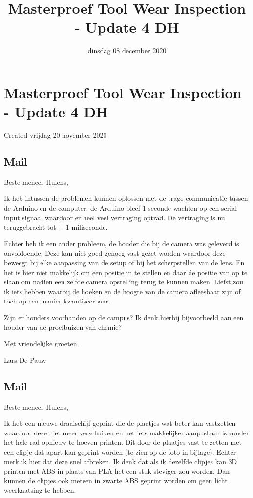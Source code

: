 \documentclass{scrartcl}
\title{Masterproef Tool Wear Inspection - Update 4 DH}
\date{dinsdag 08 december 2020}
\author{}
\begin{document}
\maketitle

		\section{Masterproef Tool Wear Inspection - Update 4 DH}

Created vrijdag 20 november 2020



\subsection{Mail}

Beste meneer Hulens,

 

Ik heb intussen de problemen kunnen oplossen met de trage communicatie tussen de Arduino en de computer: de Arduino bleef 1 seconde wachten op een serial input signaal waardoor er heel veel vertraging optrad. De vertraging is nu teruggebracht tot +-1 miliseconde.

 

Echter heb ik een ander probleem, de houder die bij de camera was geleverd is onvoldoende. Deze kan niet goed genoeg vast gezet worden waardoor deze beweegt bij elke aanpassing van de setup of bij het scherpstellen van de lens. En het is hier niet makkelijk om een positie in te stellen en daar de positie van op te slaan om nadien een zelfde camera opstelling terug te kunnen maken. Liefst zou ik iets hebben waarbij de hoeken en de hoogte van de camera afleesbaar zijn of toch op een manier kwantiseerbaar.

 

Zijn er houders voorhanden op de campus? Ik denk hierbij bijvoorbeeld aan een houder van de proefbuizen van chemie?

 

Met vriendelijke groeten,

 

Lars De Pauw



\subsection{Mail}

Beste meneer Hulens,

 

Ik heb een nieuwe draaischijf geprint die de plaatjes wat beter kan vastzetten waardoor deze niet meer verschuiven en het iets makkelijker aanpasbaar is zonder het hele rad opnieuw te hoeven printen. Dit door de plaatjes vast te zetten met een clipje dat apart kan geprint worden (te zien op de foto in bijlage). Echter merk ik hier dat deze snel afbreken. Ik denk dat als ik dezelfde clipjes kan 3D printen met ABS in plaats van PLA het een stuk steviger zou worden. Dan kunnen de clipjes ook meteen in zwarte ABS geprint worden om geen licht weerkaatsing te hebben.
\end{document}

